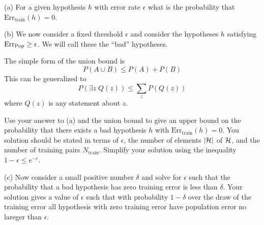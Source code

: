 \medskip
(a) For a given hypothesis $h$ with error rate $\epsilon$ what is the probability that $\mathrm{Err}_{\mathrm{train}}(h) = 0$.


\medskip
(b) We now consider a fixed threshold $\epsilon$ and consider the hypotheses $h$ satisfying $\mathrm{Err}_{\mathrm{Pop}} \geq \epsilon$.
We will call these the ``bad'' hypotheses. 

\medskip
The simple form of the union bound is
$$P(A \cup B) \leq P(A) + P(B)$$
This can be generalized to
$$P(\exists z\; Q(z)) \leq \sum_z P(Q(z))$$
where $Q(z)$ is any statement about $z$.  

\medskip
Use your answer to (a) and the union bound to give an upper bound on the probability that 
there exists a bad hypothesis $h$ with $\mathrm{Err}_{\mathrm{train}}(h) = 0$.
You solution should be stated in terms of $\epsilon$, the number of elements $|{\cal H}|$ of ${\cal H}$,
and the number of training pairs $N_{\mathrm{train}}$.
Simplify your solution using the inequality $1-\epsilon \leq e^{-\epsilon}$.


\medskip
(c) Now consider a small positive number $\delta$ and solve for $\epsilon$ such that the probability that a bad hypothesis has zero training error is less than $\delta$.
Your solution gives a value of $\epsilon$  such that with probability $1-\delta$ over the draw of the training error all hypothesis with zero training error
have population error no lareger than $\epsilon$.




